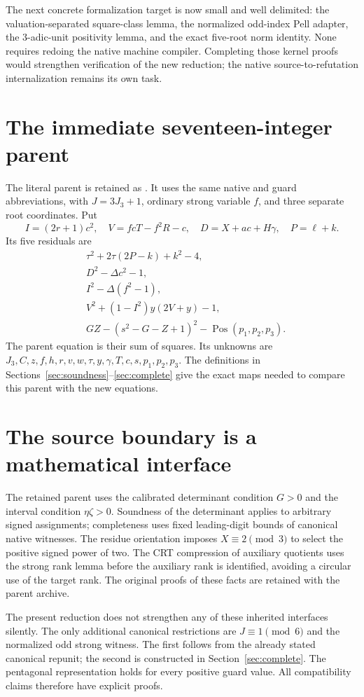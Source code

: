 \documentclass[11pt]{article}
\theoremstyle{remark}\newtheorem{remark}[theorem]{Remark}
\newcommand{\Pos}{\operatorname{Pos}}\newcommand{\ord}{\operatorname{ord}}
\newcommand{\file}[1]{\path{#1}}
\begin{document}
The next concrete formalization target is now small and well delimited:
the valuation-separated square-class lemma, the normalized odd-index Pell
adapter, the $3$-adic-unit positivity lemma, and the exact five-root norm
identity. None requires redoing the native machine compiler. Completing
those kernel proofs would strengthen verification of the new reduction;
the native source-to-refutation internalization remains its own task.

\appendix
\section{The immediate seventeen-integer parent}
The literal parent is retained as
\file{upstream/transport/degree88_17.json}. It uses the same native and
guard abbreviations, with $J=3J_3+1$, ordinary strong variable $f$, and
three separate root coordinates. Put
\[
 I=(2r+1)c^2,\quad V=fcT-f^2R-c,
 \quad D=X+ac+H\gamma,\quad P=\ell+k.
\]
Its five residuals are
\begin{align*}
 &\tau^2+2\tau(2P-k)+k^2-4,\\
 &D^2-\Delta c^2-1,\\
 &I^2-\Delta(f^2-1),\\
 &V^2+(1-I^2)y(2V+y)-1,\\
 &GZ-(s^2-G-Z+1)^2-\Pos(p_1,p_2,p_3).
\end{align*}
The parent equation is their sum of squares. Its unknowns are
$J_3,C,z,f,h,r,v,w,\tau,y,\gamma,T,c,s,p_1,p_2,p_3$.
The definitions in Sections~\ref{sec:soundness}--\ref{sec:complete}
give the exact maps needed to compare this parent with the new equations.

\section{The source boundary is a mathematical interface}
The retained parent uses the calibrated determinant condition $G>0$ and
the interval condition $\eta\zeta>0$. Soundness of the determinant applies
to arbitrary signed assignments; completeness uses fixed leading-digit
bounds of canonical native witnesses. The residue orientation imposes
$X\equiv2\pmod3$ to select the positive signed power of two. The CRT
compression of auxiliary quotients uses the strong rank lemma before the
auxiliary rank is identified, avoiding a circular use of the target rank.
The original proofs of these facts are retained with the parent archive.

The present reduction does not strengthen any of these inherited
interfaces silently. The only additional canonical restrictions are
$J\equiv1\pmod6$ and the normalized odd strong witness. The first follows
from the already stated canonical repunit; the second is constructed in
Section~\ref{sec:complete}. The pentagonal representation holds for every
positive guard value. All compatibility claims therefore have explicit
proofs.
\end{document}
